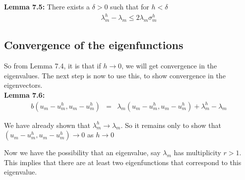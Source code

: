 \documentclass[../../main.tex]{subfiles}
\begin{document}
\textbf{Lemma 7.5:} There exists a $\delta > 0$ such that for $h < \delta$
\begin{eqnarray*}
\lambda_{m}^{h} - \lambda_{m} \leq 2\lambda_{m}\sigma_{m}^{h}
\end{eqnarray*}

\begin{comment}
\textbf{Proof:}
Using Lemma 7.4, choose $\delta$ such that $\sigma_{m}^{h} < \frac{1}{2}$. Then by Lemma 7.1 gives that $\lambda_{m}^{h} < 2\lambda_{m}$. So we have that
$\lambda_{m}^{h} - \lambda_{m} \leq 2\lambda_{m}\sigma_{m}^{h}$.
\qed
\end{comment}

\subsection{Convergence of the eigenfunctions}
So from Lemma 7.4, it is that if $h \rightarrow 0$, we will get convergence in the eigenvalues. The next step is now to use this, to show convergence in the eigenvectors.\\


\textbf{Lemma 7.6:}
\begin{eqnarray*}
b(u_{m}-u_{m}^{h},u_{m}-u_{m}^{h}) &=& \lambda_{m}( u_{m}-u_{m}^{h},u_{m}-u_{m}^{h} ) + \lambda_{m}^{h} - \lambda_{m}
\end{eqnarray*}

\begin{comment}
\textbf{Proof:}
\begin{eqnarray*}
b(u_{m}-u_{m}^{h},u_{m}-u_{m}^{h}) &=& b(u_{m},u_{m}) - 2b(u_{m},u^{h}_{m}) + b(u^{h}_{m},u^{h}_{m}) \\
								&=& \lambda_{m} ( u_{m}, u_{m} ) - 2\lambda_{m} ( u_{m}, u^{h}_{m} ) + \lambda_{m}^{h}( u_{m}^{h},u_{m}^{h} )\\
								&=&  \lambda_{m} - 2\lambda_{m} ( u_{m}, u^{h}_{m} ) + \lambda_{m}^{h} \\
								&=& 2\lambda_{m} - 2\lambda_{m} ( u_{m}, u^{h}_{m} ) + \lambda_{m}^{h} - \lambda_{m}\\
								&=& \lambda_{m}( u_{m}-u_{m}^{h},u_{m}-u_{m}^{h}) + \lambda_{m}^{h} - \lambda_{m}
\end{eqnarray*}
\qed
\end{comment}

We have already shown that $\lambda_{m}^{h} \rightarrow \lambda_{m}$. So it remains only to show that $( u_{m}-u_{m}^{h},u_{m}-u_{m}^{h}) \rightarrow 0$ as $h \rightarrow 0$


Now we have the possibility that an eigenvalue, say $\lambda_{m}$ has multiplicity $r>1$. This implies that there are at least two eigenfunctions that correspond to this eigenvalue.\\
\end{document}
